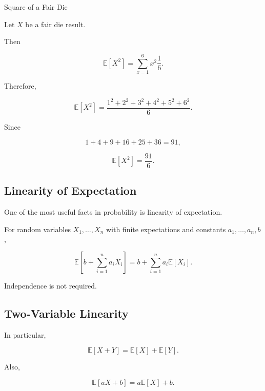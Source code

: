 \begin{workedexamplebox}{Square of a Fair Die}

Let \(X\) be a fair die result.

Then

\[
\mathbb{E}[X^2]
=
\sum_{x=1}^{6}
x^2\frac16.
\]

Therefore,

\[
\mathbb{E}[X^2]
=
\frac{
1^2+2^2+3^2+4^2+5^2+6^2
}{6}.
\]

Since

\[
1+4+9+16+25+36=91,
\]

\begin{answerbox}
\[
\boxed{
\mathbb{E}[X^2]
=
\frac{91}{6}.
}
\]
\end{answerbox}

\end{workedexamplebox}

\subsection{Linearity of Expectation}
\label{subsec:linearity-expectation}

One of the most useful facts in probability is linearity of
expectation.

\begin{theorem}
For random variables \(X_1,\ldots,X_n\) with finite expectations and
constants \(a_1,\ldots,a_n,b\),

\[
\boxed{
\mathbb{E}
\left[
b+\sum_{i=1}^{n}a_iX_i
\right]
=
b+\sum_{i=1}^{n}a_i\mathbb{E}[X_i].
}
\]
\end{theorem}

Independence is not required.

\subsection{Two-Variable Linearity}
\label{subsec:two-variable-linearity}

In particular,

\[
\boxed{
\mathbb{E}[X+Y]
=
\mathbb{E}[X]
+
\mathbb{E}[Y].
}
\]

Also,

\[
\boxed{
\mathbb{E}[aX+b]
=
a\mathbb{E}[X]+b.
}
\]

